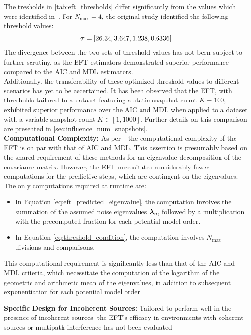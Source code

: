 The tresholds in \autoref{tab:eft_thresholds} differ significantly from the values which were identified in~\cite{eft}.
For \( N_{\max} = 4 \), the original study identified the following threshold values:
\[
    \boldsymbol{\tau} = \left[26.34, 3.647, 1.238, 0.6336 \right]
\]
The divergence between the two sets of threshold values has not been subject to further scrutiny, as the EFT estimators
demonstrated superior performance compared to the AIC and MDL estimators.\\
Additionally, the transferability of these optimized threshold values to different scenarios has yet to be ascertained.
It has been observed that the EFT, with thresholds tailored to a dataset featuring a static snapshot count \( K = 100 \),
exhibited superior performance over the AIC and MDL when applied to a dataset with a variable snapshot count \( K \in [1, 1000] \).
Further details on this comparison are presented in \autoref{sec:influence_num_snapshots}.\\

\textbf{Computational Complexity:} As per~\cite{eft}, the computational complexity of the EFT is on par with that of AIC
and MDL. This assertion is presumably based on the shared requirement of these methods for an eigenvalue decomposition of
the covariance matrix. However, the EFT necessitates considerably fewer computations for the predictive steps, which are
contingent on the eigenvalues. The only computations required at runtime are:

\begin{itemize}
    \item In Equation \ref{eq:eft_predicted_eigenvalue}, the computation involves the summation of the assumed noise
    eigenvalues \( \boldsymbol{\lambda}_\eta \), followed by a multiplication with the precomputed fraction for each potential model order.
    \item In Equation \ref{eq:threshold_condition}, the computation involves \( N_{\max} \) divisions and comparisons.
\end{itemize}

This computational requirement is significantly less than that of the AIC and MDL criteria, which necessitate the
computation of the logarithm of the geometric and arithmetic mean of the eigenvalues, in addition to subsequent
exponentiation for each potential model order.

\textbf{Specific Design for Incoherent Sources:} Tailored to perform well in the presence of incoherent sources,
the EFT's efficacy in environments with coherent sources or multipath interference has not been evaluated.

